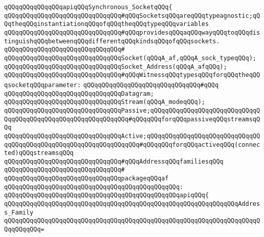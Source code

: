 \verb|qQQqqQQqqQQqqQQqapiqQQqSynchronous_SocketqQQq{|\newline
\newline
\verb|qQQqqQQqqQQqqQQqqQQqqQQqqQQqqQQq#qQQqSocketsqQQqareqQQqtypeagnostic;qQQqtheqQQqinstantiationqQQqofqQQqtheqQQqtypeqQQqvariables|\newline
\verb|qQQqqQQqqQQqqQQqqQQqqQQqqQQqqQQq#qQQqprovidesqQQqaqQQqwayqQQqtoqQQqdistinguishqQQqbetweenqQQqdifferentqQQqkindsqQQqofqQQqsockets.|\newline
\verb|qQQqqQQqqQQqqQQqqQQqqQQqqQQqqQQq#|\newline
\verb|qQQqqQQqqQQqqQQqqQQqqQQqqQQqqQQqSocket(qQQqA_af,qQQqA_sock_typeqQQq);|\newline
\verb|qQQqqQQqqQQqqQQqqQQqqQQqqQQqqQQqSocket_Address(qQQqA_afqQQq);|\newline
\newline
\verb|qQQqqQQqqQQqqQQqqQQqqQQqqQQqqQQq#qQQqWitnessqQQqtypesqQQqforqQQqtheqQQqsocketqQQqparameter:|\newline
\verb|qQQqqQQqqQQqqQQqqQQqqQQqqQQqqQQq#qQQq|\newline
\verb|qQQqqQQqqQQqqQQqqQQqqQQqqQQqqQQqDatagram;|\newline
\verb|qQQqqQQqqQQqqQQqqQQqqQQqqQQqqQQqStream(qQQqA_modeqQQq);|\newline
\verb|qQQqqQQqqQQqqQQqqQQqqQQqqQQqqQQqPassive;qQQqqQQqqQQqqQQqqQQqqQQqqQQqqQQqqQQqqQQqqQQqqQQqqQQqqQQqqQQqqQQq#qQQqqQQqforqQQqpassiveqQQqstreamsqQQq|\newline
\verb|qQQqqQQqqQQqqQQqqQQqqQQqqQQqqQQqActive;qQQqqQQqqQQqqQQqqQQqqQQqqQQqqQQqqQQqqQQqqQQqqQQqqQQqqQQqqQQqqQQqqQQq#qQQqqQQqforqQQqactiveqQQq(connected)qQQqstreamsqQQq|\newline
\newline
\verb|qQQqqQQqqQQqqQQqqQQqqQQqqQQqqQQq#qQQqAddressqQQqfamiliesqQQq|\newline
\verb|qQQqqQQqqQQqqQQqqQQqqQQqqQQqqQQq#|\newline
\verb|qQQqqQQqqQQqqQQqqQQqqQQqqQQqqQQqpackageqQQqaf|\newline
\verb|qQQqqQQqqQQqqQQqqQQqqQQqqQQqqQQqqQQqqQQqqQQqqQQq:|\newline
\verb|qQQqqQQqqQQqqQQqqQQqqQQqqQQqqQQqqQQqqQQqqQQqqQQqapiqQQq{|\newline
\verb|qQQqqQQqqQQqqQQqqQQqqQQqqQQqqQQqqQQqqQQqqQQqqQQqqQQqqQQqqQQqqQQqAddress_Family|\newline
\verb|qQQqqQQqqQQqqQQqqQQqqQQqqQQqqQQqqQQqqQQqqQQqqQQqqQQqqQQqqQQqqQQqqQQqqQQqqQQqqQQq=|\newline
